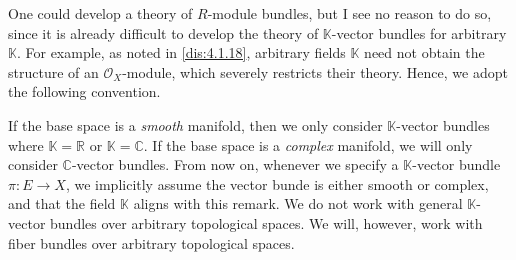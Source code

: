 \begin{remark}\label{rmk:4.1.3}
	One could develop a theory of $R$-module bundles, but I see no reason to do so, since it is already difficult to develop the theory of $\mathbb{K} $-vector bundles for arbitrary $\mathbb{K} $. For example, as noted in \cref{dis:4.1.18}, arbitrary fields $\mathbb{K} $ need not obtain the structure of an $\mathcal{O} _X$-module, which severely restricts their theory. Hence, we adopt the following convention.

	If the base space is a \emph{smooth} manifold, then we only consider $\mathbb{K} $-vector bundles where $\mathbb{K} =\mathbb{R} $ or $\mathbb{K} =\mathbb{C} $. If the base space is a \emph{complex} manifold, we will only consider $\mathbb{C} $-vector bundles. From now on, whenever we specify a $\mathbb{K} $-vector bundle $\pi : E \to X$, we implicitly assume the vector bunde is either smooth or complex, and that the field $\mathbb{K} $ aligns with this remark. We do not work with general $\mathbb{K} $-vector bundles over arbitrary topological spaces. We will, however, work with fiber bundles over arbitrary topological spaces.
\end{remark}

